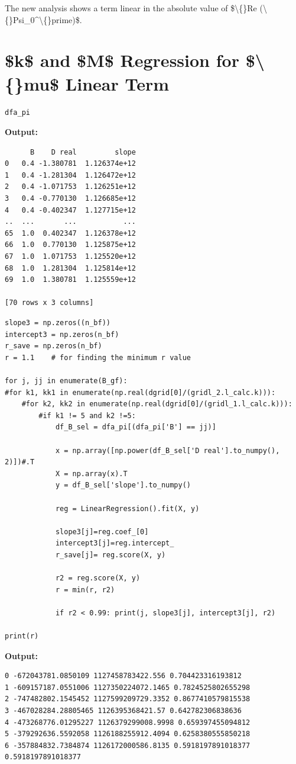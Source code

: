 \documentclass{article}
\begin{document}
The new analysis shows a term linear in the absolute value of \$\textbackslash\{\}Re (\textbackslash\{\}Psi\_0\textasciicircum{}\textbackslash\{\}prime)\$.

\section{\$k\$ and \$M\$ Regression for \$\textbackslash\{\}mu\$ Linear Term}

\begin{lstlisting}
dfa_pi\end{lstlisting}

\textbf{Output:}\begin{verbatim}
      B    D real         slope
0   0.4 -1.380781  1.126374e+12
1   0.4 -1.281304  1.126472e+12
2   0.4 -1.071753  1.126251e+12
3   0.4 -0.770130  1.126685e+12
4   0.4 -0.402347  1.127715e+12
..  ...       ...           ...
65  1.0  0.402347  1.126378e+12
66  1.0  0.770130  1.125875e+12
67  1.0  1.071753  1.125520e+12
68  1.0  1.281304  1.125814e+12
69  1.0  1.380781  1.125559e+12

[70 rows x 3 columns]
\end{verbatim}

\begin{lstlisting}
slope3 = np.zeros((n_bf))
intercept3 = np.zeros(n_bf)
r_save = np.zeros(n_bf)
r = 1.1    # for finding the minimum r value

for j, jj in enumerate(B_gf):
#for k1, kk1 in enumerate(np.real(dgrid[0]/(gridl_2.l_calc.k))):
    #for k2, kk2 in enumerate(np.real(dgrid[0]/(gridl_1.l_calc.k))):
        #if k1 != 5 and k2 !=5:
            df_B_sel = dfa_pi[(dfa_pi['B'] == jj)]

            x = np.array([np.power(df_B_sel['D real'].to_numpy(), 2)])#.T
            X = np.array(x).T
            y = df_B_sel['slope'].to_numpy()

            reg = LinearRegression().fit(X, y)

            slope3[j]=reg.coef_[0]
            intercept3[j]=reg.intercept_
            r_save[j]= reg.score(X, y)

            r2 = reg.score(X, y)
            r = min(r, r2)

            if r2 < 0.99: print(j, slope3[j], intercept3[j], r2)

print(r)\end{lstlisting}

\textbf{Output:}\begin{verbatim}
0 -672043781.0850109 1127458783422.556 0.704423316193812
1 -609157187.0551006 1127350224072.1465 0.7824525802655298
2 -747482802.1545452 1127599209729.3352 0.8677410579815538
3 -467028284.28805465 1126395368421.57 0.642782306838636
4 -473268776.01295227 1126379299008.9998 0.659397455094812
5 -379292636.5592058 1126188255912.4094 0.6258380555850218
6 -357884832.7384874 1126172000586.8135 0.5918197891018377
0.5918197891018377

\end{verbatim}
\end{document}
